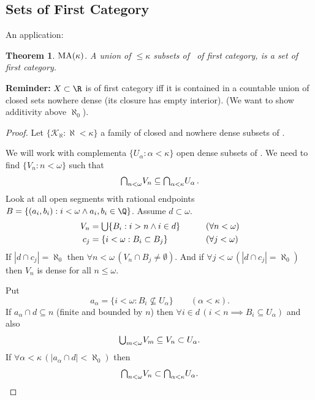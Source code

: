 \documentclass[11pt,pdftex,twoside,a4paper]{article}
\newcommand{\B}[1]{\textbf{#1}}
\newcommand{\MA}{\ensuremath{\mathop{\rm MA}\nolimits}}
\newtheorem{thm}{Theorem}[section]
\theoremstyle{definition}
\begin{document}
\subsection{Sets of First Category}

An application:
\begin{thm}
\(\MA(\kappa)\).
A union of \(\leq \kappa\) subsets of \R\ of first category, is a set of
first category.
\end{thm}
\B{Reminder:} \(X\subset\R\) is of first category iff
it is contained in a countable union of closed sets nowhere dense
(its closure has empty interior).
(We want to show additivity above \(\aleph_0\)).
\begin{proof}
Let \(\{\mathscr{K}_\aleph: \aleph < \kappa\}\) 
a family of closed and nowhere dense subsets of \R.

We will work with complementa \(\{U_\alpha: \alpha<\kappa\}\)
open dense subsets of \R. We need to find \(\{V_n: n<\omega\}\)
such that 
\begin{equation*}
\mathsmaller{\bigcap_{n<\omega}} V_n \subseteq 
  \mathsmaller{\bigcap_{\alpha<\kappa}} U_\alpha\,.
\end{equation*}
Look at all open segments with rational endpoints
\(B=\{(a_i, b_i): i < \omega \land a_i,b_i \in \Q\}\).
Assume \(d\subset \omega\).
\begin{alignat*}{2}
V_n &= \mathsmaller{\bigcup} \{B_i: i > n \land i \in d\} 
  \qquad && (\forall n < \omega) \\
c_j &= \{i < \omega: B_i \subset B_j\}
  \qquad && (\forall j < \omega) \\
\end{alignat*}
If \(|d \cap c_j| = \aleph_0\) 
then \(\forall n < \omega\, (V_n \cap B_j \neq \emptyset)\).
And if \(\forall j < \omega\, (|d \cap c_j| = \aleph_0)\) 
then \(V_n\) is dense for all \(n \leq \omega\).

Put 
\begin{equation*}
a_\alpha = \{i < \omega: B_i \not\subseteq U_\alpha\} \qquad (\alpha < \kappa).
\end{equation*}
If \(a_\alpha \cap d \subseteq n\) (finite and bounded by $n$)
then \(\forall i\in d\,(i < n \implies B_i \subseteq U_\alpha)\)
and also 
\begin{equation*}
\mathsmaller{\bigcup_{m<\omega}} V_m \subseteq V_n \subset U_\alpha.
\end{equation*}
If \(\forall \alpha<\kappa\,(|a_\alpha \cap d|<\aleph_0)\)
then 
\begin{equation*}
\mathsmaller{\bigcap_{n<\omega}} V_n \subset
  \mathsmaller{\bigcap_{\alpha<\kappa}} U_\alpha .
\end{equation*}
\end{proof}
\end{document}
